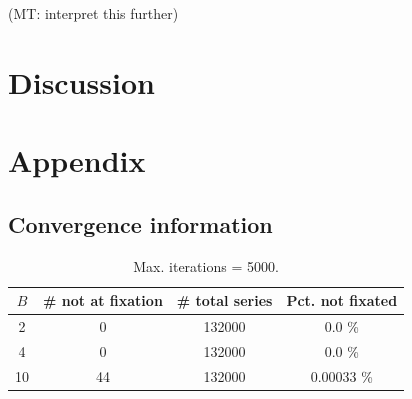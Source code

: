 \documentclass[letterpaper,11.5pt]{scrartcl}
\newcommand{\mt}[1]{{\textcolor{myorange} {({\tiny MT:} #1)}}}
\begin{document}
\mt{interpret this further}










\section{Discussion}




\setlength{\bibleftmargin}{.125in}
\setlength{\bibindent}{-\bibleftmargin}

% 



\appendix

\section{Appendix}



\subsection{Convergence information}

\begin{table}[h]
  \caption{Max. iterations = 5000.}
  \centering
  \begin{tabular}{cccc} \toprule
    $B$ & \# not at fixation & \# total series & Pct. not fixated \\
    \midrule  
    2  & 0  & 132000 & 0.0 \% \\
    4  & 0  & 132000 & 0.0 \% \\
    10 & 44 & 132000 & 0.00033  \% \\
    \bottomrule
  \end{tabular} 
\end{table}
\end{document}
